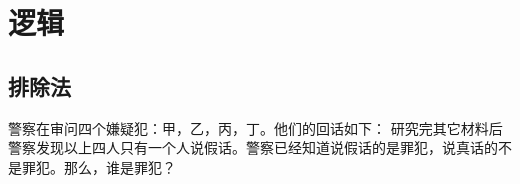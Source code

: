 
\chapter{逻辑}
\label{chap:logic}
\def\BKC{\cellcolor{gray!50}}   %

\section{排除法}
\begin{example}
  警察在审问四个嫌疑犯：甲，乙，丙，丁。他们的回话如下：
  研究完其它材料后警察发现以上四人只有一个人说假话。警察已经知道说假话的是罪犯，说真话的不是罪犯。那么，谁是罪犯？
\end{example}
